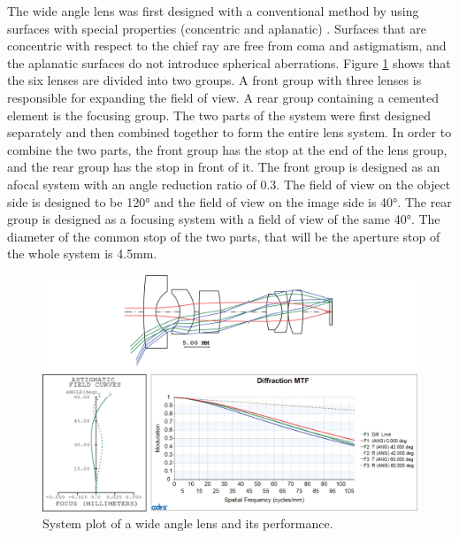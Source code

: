 The wide angle lens was first designed with a conventional method by using surfaces with special properties (concentric and aplanatic) \cite{LivshitsQA2013}. Surfaces that are concentric with respect to the chief ray are free from coma and astigmatism, and the aplanatic surfaces do not introduce spherical aberrations. Figure \ref{fig:wideanglelensPerformance} shows that the six lenses are divided into two groups. A front group with three lenses is responsible for expanding the field of view. A rear group containing a cemented element is the focusing group. The two parts of the system were first designed separately and then combined together to form the entire lens system.  In order to combine the two parts, the front group has the stop at the end of the lens group, and the rear group has the stop in front of it.  The front group is designed as an afocal system with an angle reduction ratio of 0.3. The field of view on the object side is designed to be 120° and the field of view on the image side is 40°. The rear group is designed as a focusing system with a field of view of the same 40°. The diameter of the common stop of the two parts, that will be the aperture stop of the whole system is 4.5mm. 

\begin{figure}[h!]
    \centering
    \includegraphics[scale=0.68]{chapter-4/figures/WideAngleL.png}
    \caption{System plot of a wide angle lens and its performance.}
    \label{fig:wideanglelensPerformance}
\end{figure}

